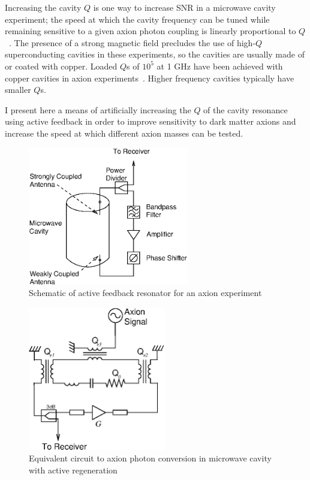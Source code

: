 \documentclass[aps,prl,twocolumn,groupedaddress]{revtex4-1}
\begin{document}
Increasing the cavity $Q$ is one way to increase SNR in a microwave cavity experiment; the speed at which the cavity frequency can be tuned while remaining sensitive to a given axion photon coupling is linearly proportional to $Q$~\cite{Peng2000569}.
The presence of a strong magnetic field precludes the use of high-$Q$ superconducting cavities in these experiments, so the cavities are usually made of or coated with copper.
Loaded $Q$s of $10^5$ at 1 GHz have been achieved with copper cavities in axion experiments~\cite{Peng2000569}.  Higher frequency cavities typically have smaller $Q$s.

I present here a means of artificially increasing the $Q$ of the cavity resonance using active feedback in order to improve sensitivity to dark matter axions and increase the speed at which different axion masses can be tested.

\begin{figure}
\includegraphics[width=7cm]{figs/experiment_schematic.eps}
\caption{\label{fig:experiment_schematic} Schematic of active feedback resonator for an axion experiment}
\end{figure}


\begin{figure}
\includegraphics[width=6cm]{figs/equivalent_circuit.eps}
\caption{\label{fig:equiv_circuit} Equivalent circuit to axion photon conversion in microwave cavity with active regeneration}
\end{figure}
\end{document}
